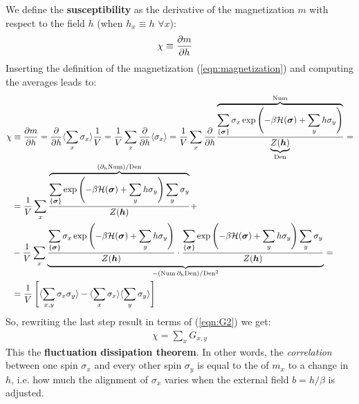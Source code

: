 \documentclass[../../main.tex]{subfiles}
\begin{document}
We define the \textbf{susceptibility} as the derivative of the magnetization $m$ with respect to the field $h$ (when $h_x \equiv h$ $\forall x$):
\begin{align*}
    \chi &\equiv \pdv{m}{h}
\end{align*}
Inserting the definition of the magnetization (\ref{eqn:magnetization}) and computing the averages leads to:
\vspace{-2em}
\begin{align*}
    \chi &\equiv \pdv{m}{h} = \pdv{h} \langle \sum_x \sigma_x \rangle \frac{1}{V} = \frac{1}{V} \sum_x \pdv{h} \langle \sigma_x \rangle  = \frac{1}{V} \sum_x \pdv{h}
    \frac{\displaystyle \overbrace{\sum_{\{\bm{\sigma}\}} \sigma_x \exp\left(- \beta \mathcal{H}(\bm{\sigma}) + \sum_y h \sigma_y \right)}^{\mathclap{\mathrm{Num}}} }{\underbrace{Z(\bm{h})}_{\mathrm{Den}} } = \\
    &= \frac{1}{V} \sum_x 
    \frac{\displaystyle \overbrace{\sum_{\{\bm{\sigma}\}} \exp\left(-\beta \mathcal{H}(\bm{\sigma}) + \sum_y h \sigma_y\right) \sum_y \sigma_y}^{(\partial_h \mathrm{Num}) / \mathrm{Den}  } }
         {Z(\bm{h})} +\\
    &-\frac{1}{V}\sum_x \underbrace{\frac{\displaystyle 
    \sum_{\{\bm{\sigma}\}} \sigma_x \exp\left(- \beta \mathcal{H}(\bm{\sigma}) + \sum_y h \sigma_y\right)}{Z(\bm{h})}\cdot \frac{\displaystyle \sum_{\{\bm{\sigma}\}} \exp\left(-\beta \mathcal{H}(\bm{\sigma}) + \sum_y h \sigma_y \right) \sum_y \sigma_y}{Z(\bm{h})} }_{-(\mathrm{Num} \,\partial_h \mathrm{Den}) / \mathrm{Den}^2 } =\\
    &= \frac{1}{V}\left[\langle \sum_{x,y} \sigma_x \sigma_y \rangle - \langle \sum_x \sigma_x \rangle \langle \sum_y \sigma_y \rangle\right] 
\end{align*}
So, rewriting the last step result in terms of (\ref{eqn:G2}) we get:
\begin{align}\label{eqn:fluctuation_dissipation}
    \chi = \sum_x G_{x,y}
\end{align}
This the \textbf{fluctuation dissipation theorem}. In other words, the  \textit{correlation} between one spin $\sigma_x$ and every other spin $\sigma_y$ is equal to the  of $m_x$ to a change in $h$, i.e. how much the alignment of $\sigma_x$ varies when the external field $b = h/\beta$ is adjusted.
 
\medskip
\end{document}
